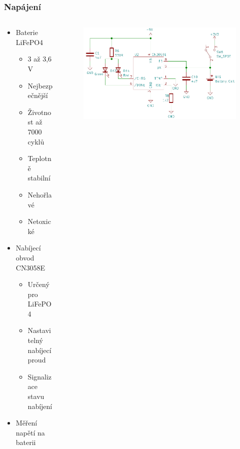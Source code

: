 \documentclass[%
  12pt,       				%
	t,                  %
	aspectratio=1610,   %
	unicode,						%
]{beamer}				    	%
\begin{document}
\begin{frame} 
	\frametitle{Napájení}
	
	\begin{columns}[T] 								%
		\begin{column}{0.4\textwidth}		%
			\begin{itemize}
				\item Baterie LiFePO4
				\begin{itemize}
					\item 3 až 3,6 V
					\item Nejbezpečnější
					\item Životnost až 7000 cyklů 
					\item Teplotně stabilní
					\item Nehořlavé
					\item Netoxické
				\end{itemize}
				\item Nabíjecí obvod CN3058E
				\begin{itemize}
					\item Určený pro LiFePO4
					\item Nastavitelný nabíjecí proud
					\item Signalizace stavu nabíjení 
				\end{itemize}
				\item Měření napětí na baterii 
			\end{itemize}
		\end{column}
		\begin{column}{0.6\textwidth}		%
			\begin{figure}%
				\centering
				\vspace{1cm}	              %
				\includegraphics[width=1\columnwidth]{obrazky/CN3058E.png}
			\end{figure}
		\end{column}
	\end{columns}											%
\end{frame}
\end{document}

